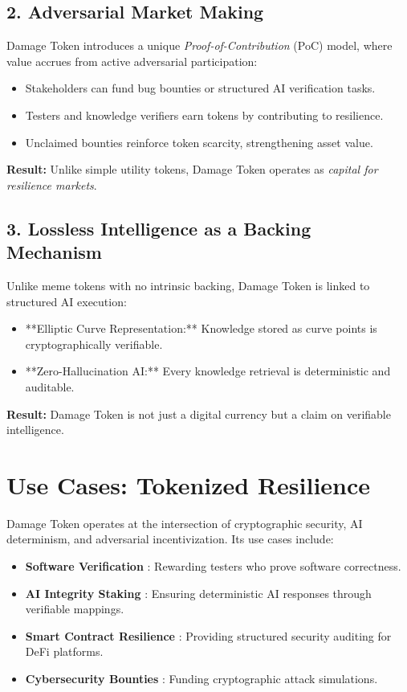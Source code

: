 \documentclass{article}
\begin{document}
\subsection{2. Adversarial Market Making}
Damage Token introduces a unique \textit{Proof-of-Contribution} (PoC) model, where value accrues from active adversarial participation:
\begin{itemize}
    \item Stakeholders can fund bug bounties or structured AI verification tasks.
    \item Testers and knowledge verifiers earn tokens by contributing to resilience.
    \item Unclaimed bounties reinforce token scarcity, strengthening asset value.
\end{itemize}
\textbf{Result:} Unlike simple utility tokens, Damage Token operates as \textit{capital for resilience markets}.

\subsection{3. Lossless Intelligence as a Backing Mechanism}
Unlike meme tokens with no intrinsic backing, Damage Token is linked to structured AI execution:
\begin{itemize}
    \item **Elliptic Curve Representation:** Knowledge stored as curve points is cryptographically verifiable.
    \item **Zero-Hallucination AI:** Every knowledge retrieval is deterministic and auditable.
\end{itemize}
\textbf{Result:} Damage Token is not just a digital currency but a claim on verifiable intelligence.

\section{Use Cases: Tokenized Resilience}
Damage Token operates at the intersection of cryptographic security, AI determinism, and adversarial incentivization. Its use cases include:

\begin{itemize}
    \item \textbf{Software Verification} : Rewarding testers who prove software correctness.
    \item \textbf{AI Integrity Staking} : Ensuring deterministic AI responses through verifiable mappings.
    \item \textbf{Smart Contract Resilience} : Providing structured security auditing for DeFi platforms.
    \item \textbf{Cybersecurity Bounties} : Funding cryptographic attack simulations.
\end{itemize}
\end{document}
